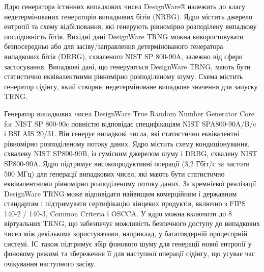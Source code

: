Ядро генератора істинних випадкових чисел DesignWare® належить до класу недетермінованих генераторів випадкових бітів (NRBG). Ядро містить джерело ентропії та схему відбілювання, які генерують рівномірно розподілену випадкову послідовність бітів. Вихідні дані DesignWare TRNG можна використовувати безпосередньо або для засіву/заправлення детермінованого генератора випадкових бітів (DRBG), схваленого NIST SP 800-90A, залежно від сфери застосування. Випадкові дані, що генеруються DesignWare TRNG, мають бути статистично еквівалентними рівномірно розподіленому шуму. Схема містить генератор сідінгу, який створює недетерміноване випадкове значення для запуску TRNG.

Генератор випадкових чисел DesignWare True Random Number Generator Core for NIST SP 800-90c повністю відповідає специфікаціям NIST SPA800-90A/B/c і BSI AIS 20/31. Він генерує випадкові числа, які статистично еквівалентні рівномірно розподіленому потоку даних. Ядро містить схему кондиціонування, схвалену NIST SP800-90B, із сумісним джерелом шуму і DRBG, схвалену NIST SP800-90A. Ядро підтримує високопродуктивні операції (3,2 Гбіт/с за частоти 500 МГц) для генерації випадкових чисел, які мають бути статистично еквівалентними рівномірно розподіленому потоку даних. За кремнієвої реалізації DesignWare TRNG може відповідати найвищим комерційним і державним стандартам і підтримувати сертифікацію кінцевих продуктів, включно з FIPS 140-2 / 140-3, Common Criteria і OSCCA. У ядро можна включити до 8 віртуальних TRNG, що забезпечує можливість безпечного доступу до випадкових чисел між декількома користувачами, наприклад, у багатоядерній процесорній системі. ІС також підтримує збір фонового шуму для генерації нової ентропії у фоновому режимі та збереження її для наступної операції сідінгу, що усуває час очікування наступного засіву.